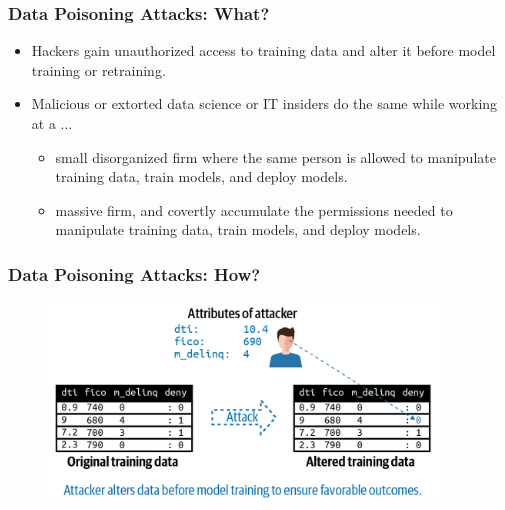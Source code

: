 \documentclass[11pt,
               aspectratio=169,
               hyperref={colorlinks}
               ]{beamer}
\begin{document}
			\begin{frame}
		
				\frametitle{Data Poisoning Attacks: \textbf{What?}}
				
				\begin{itemize}
					\item Hackers gain unauthorized access to training data and alter it before model training or retraining.
					\item Malicious or extorted data science or IT insiders do the same while working at a ...
					\begin{itemize}
						\item small disorganized firm where the same person is allowed to manipulate training data, train models, and deploy models.
						\item massive firm, and covertly accumulate the permissions needed to manipulate training data, train models, and deploy models.
					\end{itemize}
				\end{itemize}
			
			\end{frame}
			
			\begin{frame}[label={slide:data_poisoning}]
		
				\frametitle{Data Poisoning Attacks: \textbf{How?}}		
			
				\begin{figure}[htb]
					\begin{center}
						\includegraphics[height=150pt]{../img/poisoning.png}
					\end{center}
				\end{figure}
			
		
			\end{frame}
		
\end{document}
